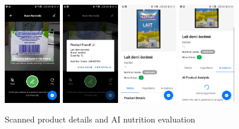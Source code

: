 \begin{figure}[H]
    \centering
    \includegraphics[width=0.22\textwidth]{images/Screenshot_20250919-231229_SCANN_barecode.jpg}
    \includegraphics[width=0.22\textwidth]{images/Screenshot_20250919-231233_Scann_success.jpg}
    \includegraphics[width=0.22\textwidth]{images/Screenshot_20250919-231251_SCANN-end.jpg}
    \includegraphics[width=0.22\textwidth]{images/Screenshot_20250919-232403_SCANN_AI_analysis.jpg}
    \caption{Scanned product details and AI nutrition evaluation}
    \label{fig:natilait_screenshots}
\end{figure}

